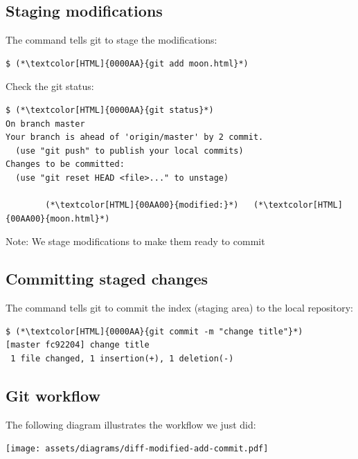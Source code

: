 \subsection{Staging modifications}
\begin{frame}[fragile]
  \subslidetitle

  The command  tells git to stage the modifications:
  \begin{lstlisting}
$ (*\textcolor[HTML]{0000AA}{git add moon.html}*)
\end{lstlisting}

  Check the git status:
  \begin{lstlisting}
$ (*\textcolor[HTML]{0000AA}{git status}*)
On branch master
Your branch is ahead of 'origin/master' by 2 commit.
  (use "git push" to publish your local commits)
Changes to be committed:
  (use "git reset HEAD <file>..." to unstage)

        (*\textcolor[HTML]{00AA00}{modified:}*)   (*\textcolor[HTML]{00AA00}{moon.html}*)
\end{lstlisting}
  \vspace{1em}
  Note: We stage modifications to make them ready to commit
\end{frame}

\subsection{Committing staged changes}
\begin{frame}[fragile]
  \subslidetitle

  The command  tells git to commit the index (staging area) to the local repository:
  \begin{lstlisting}
$ (*\textcolor[HTML]{0000AA}{git commit -m "change title"}*)
[master fc92204] change title
 1 file changed, 1 insertion(+), 1 deletion(-)
\end{lstlisting}
\end{frame}

\subsection{Git workflow}
\begin{frame}[fragile]
  \subslidetitle
  The following diagram illustrates the workflow we just did: \\
  \vspace{2em}
  \centerline{\texttt{[image: assets/diagrams/diff-modified-add-commit.pdf]}}
\end{frame}

